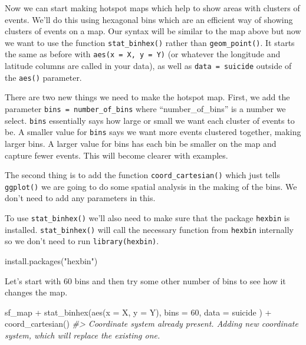 \documentclass[
]{krantz}
\makeatletter
\newenvironment{Shaded}{\begin{snugshade}}{\end{snugshade}}
\newcommand{\AttributeTok}[1]{\textcolor[rgb]{0.61,0.61,0.61}{#1}}
\newcommand{\CommentTok}[1]{\textcolor[rgb]{0.37,0.37,0.37}{\textit{#1}}}
\newcommand{\DecValTok}[1]{\textcolor[rgb]{0.06,0.06,0.06}{#1}}
\newcommand{\FunctionTok}[1]{\textcolor[rgb]{0,0,0}{#1}}
\newcommand{\NormalTok}[1]{#1}
\newcommand{\SpecialCharTok}[1]{\textcolor[rgb]{0,0,0}{#1}}
\newcommand{\StringTok}[1]{\textcolor[rgb]{0.5,0.5,0.5}{#1}}
\newenvironment{kframe}{%
\medskip{}
\setlength{\fboxsep}{.8em}
 \def\at@end@of@kframe{}%
 \ifinner\ifhmode%
  \def\at@end@of@kframe{\end{minipage}}%
  \begin{minipage}{\columnwidth}%
 \fi\fi%
 \def\FrameCommand##1{\hskip\@totalleftmargin \hskip-\fboxsep
 \colorbox{shadecolor}{##1}\hskip-\fboxsep
     \hskip-\linewidth \hskip-\@totalleftmargin \hskip\columnwidth}%
 \MakeFramed {\advance\hsize-\width
   \@totalleftmargin\z@ \linewidth\hsize
   \@setminipage}}%
 {\par\unskip\endMakeFramed%
 \at@end@of@kframe}
\renewenvironment{Shaded}{\begin{kframe}}{\end{kframe}}
\makeatother
\begin{document}
Now we can start making hotspot maps which help to show
areas with clusters of events. We'll do this using hexagonal
bins which are an efficient way of showing clusters of
events on a map. Our syntax will be similar to the map above
but now we want to use the function \texttt{stat\_binhex()}
rather than \texttt{geom\_point()}. It starts the same as
before with \texttt{aes(x\ =\ X,\ y\ =\ Y)} (or whatever the
longitude and latitude columns are called in your data), as
well as \texttt{data\ =\ suicide} outside of the
\texttt{aes()} parameter.

There are two new things we need to make the hotspot map.
First, we add the parameter
\texttt{bins\ =\ number\_of\_bins} where
``number\_of\_bins'' is a number we select. \texttt{bins}
essentially says how large or small we want each cluster of
events to be. A smaller value for \texttt{bins} says we want
more events clustered together, making larger bins. A larger
value for bins has each bin be smaller on the map and
capture fewer events. This will become clearer with
examples.

The second thing is to add the function
\texttt{coord\_cartesian()} which just tells
\texttt{ggplot()} we are going to do some spatial analysis
in the making of the bins. We don't need to add any
parameters in this.

To use \texttt{stat\_binhex()} we'll also need to make sure
that the package \texttt{hexbin} is installed.
\texttt{stat\_binhex()} will call the necessary function
from \texttt{hexbin} internally so we don't need to run
\texttt{library(hexbin)}.

\begin{Shaded}
\begin{Highlighting}[]
\FunctionTok{install.packages}\NormalTok{(}\StringTok{"hexbin"}\NormalTok{)}
\end{Highlighting}
\end{Shaded}

Let's start with 60 bins and then try some other number of
bins to see how it changes the map.

\begin{Shaded}
\begin{Highlighting}[]
\NormalTok{sf\_map }\SpecialCharTok{+}
  \FunctionTok{stat\_binhex}\NormalTok{(}\FunctionTok{aes}\NormalTok{(}\AttributeTok{x =}\NormalTok{ X, }\AttributeTok{y =}\NormalTok{ Y),}
    \AttributeTok{bins =} \DecValTok{60}\NormalTok{,}
    \AttributeTok{data =}\NormalTok{ suicide}
\NormalTok{  ) }\SpecialCharTok{+}
  \FunctionTok{coord\_cartesian}\NormalTok{()}
\CommentTok{\#\textgreater{} Coordinate system already present. Adding new coordinate system, which will replace the existing one.}
\end{Highlighting}
\end{Shaded}
\end{document}
